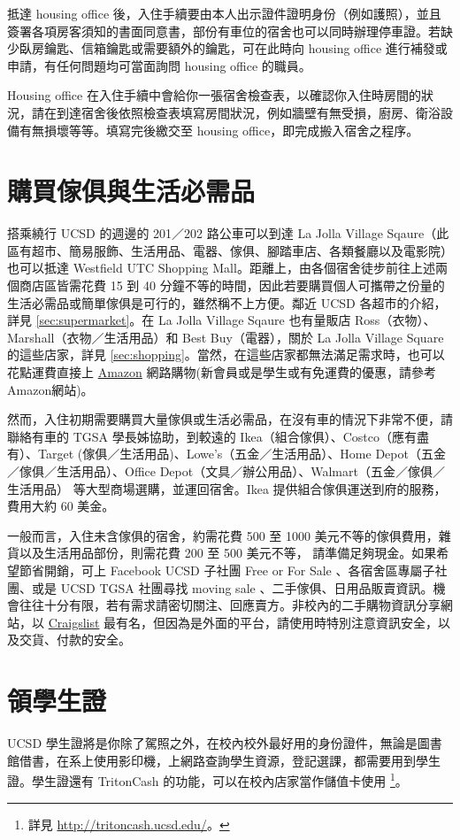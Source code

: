 \documentclass[10pt,a4paper]{book}
\begin{document}
\begin{CJK}{UTF8}{bkai}
抵達 housing office 後，入住手續要由本人出示證件證明身份（例如護照），並且簽署各項房客須知的書面同意書，部份有車位的宿舍也可以同時辦理停車證。若缺少臥房鑰匙、信箱鑰匙或需要額外的鑰匙，可在此時向 housing office 進行補發或申請，有任何問題均可當面詢問 housing office 的職員。

Housing office 在入住手續中會給你一張宿舍檢查表，以確認你入住時房間的狀況，請在到達宿舍後依照檢查表填寫房間狀況，例如牆壁有無受損，廚房、衛浴設備有無損壞等等。填寫完後繳交至 housing office，即完成搬入宿舍之程序。 

\section{購買傢俱與生活必需品}

搭乘繞行 UCSD 的週邊的 201／202 路公車可以到達 La Jolla Village Sqaure（此區有超市、簡易服飾、生活用品、電器、傢俱、腳踏車店、各類餐廳以及電影院）也可以抵達 Westfield UTC Shopping Mall。距離上，由各個宿舍徒步前往上述兩個商店區皆需花費 15 到 40 分鐘不等的時間，因此若要購買個人可攜帶之份量的生活必需品或簡單傢俱是可行的，雖然稱不上方便。鄰近 UCSD 各超市的介紹，詳見 \ref{sec:supermarket}。在 La Jolla Village Sqaure 也有量販店 Ross（衣物）、Marshall（衣物／生活用品）和 Best Buy（電器），關於 La Jolla Village Square 的這些店家，詳見 \ref{sec:shopping}。當然，在這些店家都無法滿足需求時，也可以花點運費直接上 \href{http://www.amazon.com/}{Amazon} 網路購物(新會員或是學生或有免運費的優惠，請參考Amazon網站)。

然而，入住初期需要購買大量傢俱或生活必需品，在沒有車的情況下非常不便，請聯絡有車的 TGSA 學長姊協助，到較遠的 Ikea（組合傢俱）、Costco（應有盡有）、Target (傢俱／生活用品)、Lowe's（五金／生活用品）、Home Depot（五金／傢俱／生活用品）、Office Depot（文具／辦公用品）、Walmart（五金／傢俱／生活用品） 等大型商場選購，並運回宿舍。Ikea 提供組合傢俱運送到府的服務，費用大約 60 美金。

一般而言，入住未含傢俱的宿舍，約需花費 500 至 1000 美元不等的傢俱費用，雜貨以及生活用品部份，則需花費 200 至 500 美元不等， 請準備足夠現金。如果希望節省開銷，可上 Facebook UCSD 子社團 Free or For Sale 、各宿舍區專屬子社團、或是 UCSD TGSA 社團尋找 moving sale 、二手傢俱、日用品販賣資訊。機會往往十分有限，若有需求請密切關注、回應賣方。非校內的二手購物資訊分享網站，以 \href{http://sandiego.craigslist.org/}{Craigslist} 最有名，但因為是外面的平台，請使用時特別注意資訊安全，以及交貨、付款的安全。

\section{領學生證}
UCSD 學生證將是你除了駕照之外，在校內校外最好用的身份證件，無論是圖書館借書，在系上使用影印機，上網路查詢學生資源，登記選課，都需要用到學生證。學生證還有 TritonCash 的功能，可以在校內店家當作儲值卡使用 \footnote{詳見 \url{http://tritoncash.ucsd.edu/}。}。


\end{CJK}
\end{document}
